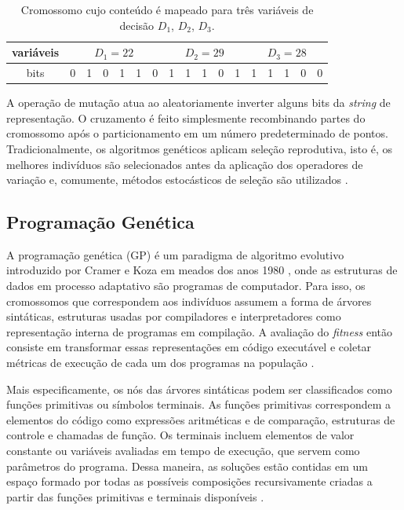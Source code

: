 \documentclass[
	12pt,				%
	openright,			%
	twoside,			%
	a4paper,			%
	tcc,			%
	]{ABNT-DC-UEL}
\begin{document}
\begin{table}[htb]
    \centering
    \begin{tabular}{|c||c|c|c|c|c|c|c|c|c|c|c|c|c|c|c|c|}
        \hline
        variáveis & \multicolumn{6}{c|}{$D_1 = 22$} & \multicolumn{5}{c|}{$D_2 = 29$} & \multicolumn{5}{c|}{$D_3 = 28$} \\
        \hline
        bits & 0 & 1 & 0 & 1 & 1 & 0 & 1 & 1 & 1 & 0 & 1 & 1 & 1 & 1 & 0 & 0 \\
        \hline
    \end{tabular}
    \caption{Cromossomo cujo conteúdo é mapeado para três variáveis de decisão $D_1$, $D_2$, $D_3$.}
    \label{tab:variaveis-decisao}
\end{table}

A operação de mutação atua ao aleatoriamente inverter alguns bits da \textit{string} de representação. O cruzamento é feito simplesmente recombinando partes do cromossomo após o particionamento em um número predeterminado de pontos. Tradicionalmente, os algoritmos genéticos aplicam seleção reprodutiva, isto é, os melhores indivíduos são selecionados antes da aplicação dos operadores de variação e, comumente, métodos estocásticos de seleção são utilizados \cite{back:00}.

\subsection{Programação Genética}

A programação genética (GP) é um paradigma de algoritmo evolutivo introduzido por Cramer e Koza em meados dos anos 1980 \cite{cramer:85, koza:89}, onde as estruturas de dados em processo adaptativo são programas de computador. Para isso, os cromossomos que correspondem aos indivíduos assumem a forma de árvores sintáticas, estruturas usadas por compiladores e interpretadores como representação interna de programas em compilação.
A avaliação do \textit{fitness} então consiste em transformar essas representações em código executável e coletar métricas de execução de cada um dos programas na população \cite{back:00}.

Mais especificamente, os nós das árvores sintáticas podem ser classificados como funções primitivas ou símbolos terminais. As funções primitivas correspondem a elementos do código como expressões aritméticas e de comparação, estruturas de controle e chamadas de função. Os terminais incluem elementos de valor constante ou variáveis avaliadas em tempo de execução, que servem como parâmetros do programa. Dessa maneira, as soluções estão contidas em um espaço formado por todas as possíveis composições recursivamente criadas a partir das funções primitivas e terminais disponíveis \cite{koza:94}.
\end{document}

